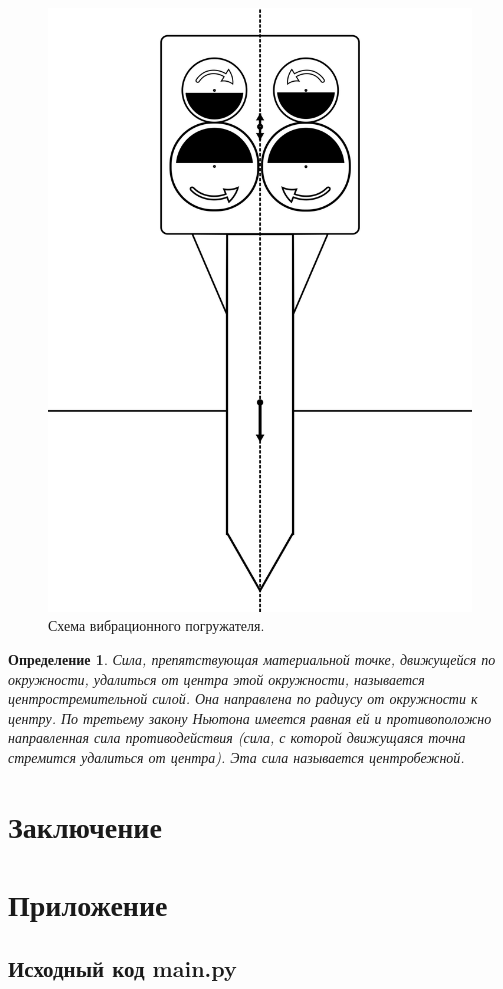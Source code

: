 \documentclass[14pt, a4paper]{extarticle}
\newtheorem{definition}{Определение}
\begin{document}
    \begin{figure}[h]
        \centering
        \includegraphics[width=0.5\linewidth]{img/scheme_porg.png}
        \caption{Схема вибрационного погружателя.}
        \label{fig:scheme_porg}
    \end{figure}

    \begin{definition}
        Сила, препятствующая материальной точке, движущейся по окружности, удалиться от центра этой окружности, называется центростремительной силой. Она направлена по радиусу от окружности к центру. По третьему закону Ньютона имеется равная ей и противоположно направленная сила противодействия (сила, с которой движущаяся точна стремится удалиться от центра). Эта сила называется центробежной.
    \end{definition}
    
    \clearpage
    \section{Заключение}


    \clearpage
    \section{Приложение}
    \subsection{Исходный код main.py}


    \clearpage
    \begin{thebibliography}{}
        \bibitem{}
    \end{thebibliography}
\end{document}
